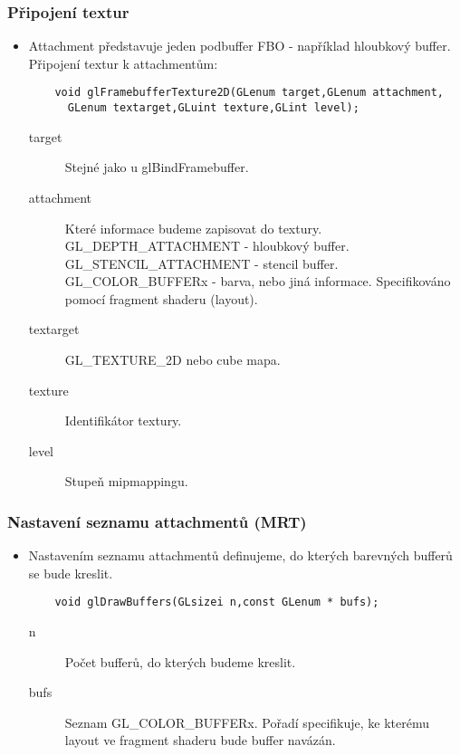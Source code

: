 \begin{frame}[fragile]
\frametitle{Připojení textur}
  \begin{itemize}
    \item{
    Attachment představuje jeden podbuffer FBO - například hloubkový buffer.
    Připojení textur k attachmentům:
    {\scriptsize
    \begin{verbatim}
    void glFramebufferTexture2D(GLenum target,GLenum attachment,
      GLenum textarget,GLuint texture,GLint level);
    \end{verbatim}
    }
    \begin{description}
    \item[target] Stejné jako u {\color{blue} glBindFramebuffer}.
    \item[attachment] Které informace budeme zapisovat do textury.
    GL\_DEPTH\_ATTACHMENT - hloubkový buffer.
    GL\_STENCIL\_ATTACHMENT - stencil buffer.
    GL\_COLOR\_BUFFERx - barva, nebo jiná informace.
    Specifikováno pomocí fragment shaderu (layout).
    \item[textarget] GL\_TEXTURE\_2D nebo cube mapa.
    \item[texture] Identifikátor textury.
    \item[level] Stupeň mipmappingu.
    \end{description}
    }
  \end{itemize}
\end{frame}

\begin{frame}[fragile]
\frametitle{Nastavení seznamu attachmentů (MRT)}
  \begin{itemize}
    \item{
    Nastavením seznamu attachmentů definujeme, do kterých barevných bufferů se bude kreslit.
    {\scriptsize
    \begin{verbatim}
    void glDrawBuffers(GLsizei n,const GLenum * bufs);
    \end{verbatim}
    }
    \begin{description}
    \item[n] Počet bufferů, do kterých budeme kreslit.
    \item[bufs] Seznam GL\_COLOR\_BUFFERx.
    Pořadí specifikuje, ke kterému layout ve fragment shaderu bude buffer navázán.
    \end{description}
    }
  \end{itemize}
\end{frame}

